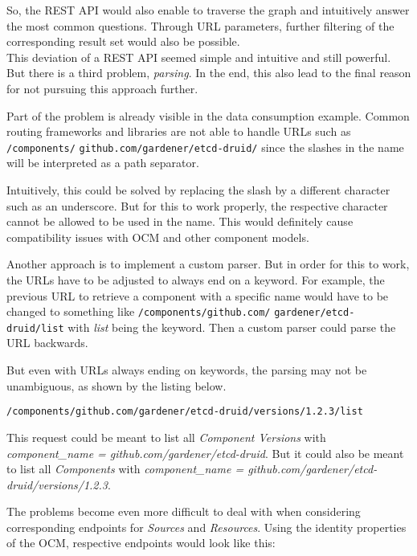So, the REST API would also enable to traverse the graph and intuitively answer the most common questions. Through URL parameters, further filtering of the corresponding result set would also be possible.\\

This deviation of a REST API seemed simple and intuitive and still powerful. But there is a third problem, \emph{parsing}. In the end, this also lead to the final reason for not pursuing this approach further.\par
Part of the problem is already visible in the data consumption example. Common routing frameworks and libraries are not able to handle URLs such as \lstinline|/components/| \lstinline|github.com/gardener/etcd-druid/| since the slashes in the name will be interpreted as a path separator.\par 
Intuitively, this could be solved by replacing the slash by a different character such as an underscore. But for this to work properly, the respective character cannot be allowed to be used in the name. This would definitely cause compatibility issues with OCM and other component models.\par 
Another approach is to implement a custom parser. But in order for this to work, the URLs have to be adjusted to always end on a keyword. For example, the previous URL to retrieve a component with a specific name would have to be changed to something like \lstinline|/components/github.com/| \lstinline|gardener/etcd-druid/list| with \emph{list} being the keyword. Then a custom parser could parse the URL backwards.\par
But even with URLs always ending on keywords, the parsing may not be unambiguous, as shown by the listing below.

\begin{lstlisting}[caption=Ambiguous REST API URL, captionpos=b, label=lst:Ambiguous URL]
/components/github.com/gardener/etcd-druid/versions/1.2.3/list
\end{lstlisting}

This request could be meant to list all \emph{Component Versions} with \emph{component\_name = github.com/gardener/etcd-druid}. But it could also be meant to list all \emph{Components} with \emph{component\_name = github.com/gardener/etcd-druid/versions/1.2.3}.\par
The problems become even more difficult to deal with when considering corresponding endpoints for \emph{Sources} and \emph{Resources}. Using the identity properties of the OCM, respective endpoints would look like this:

